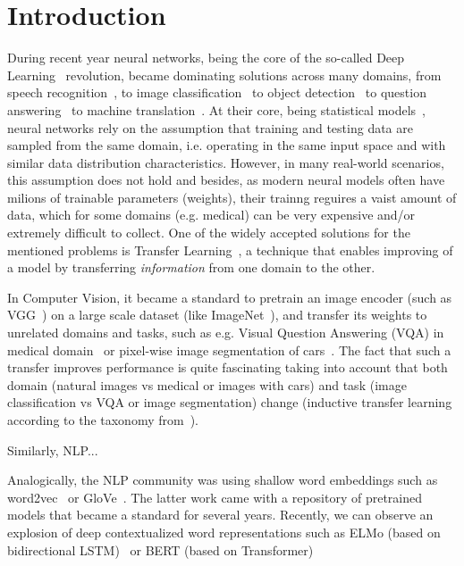 \section{Introduction}
During recent year neural networks, being the core of the so-called Deep Learning~\cite{lecun2015deep} revolution, became dominating solutions across many domains, from  speech recognition~\cite{graves2013speech}, to image classification~\cite{krizhevsky2012imagenet} to object detection~\cite{redmon2016you} to question answering~\cite{weston2014memory} to machine translation~\cite{bahdanau2014neural}.
At their core, being statistical models~\cite{ripley1993statistical,warner1996understanding}, neural networks rely on the assumption that training and testing data are sampled from the same domain, i.e. operating in the same input space and with similar data distribution characteristics.
However, in many real-world scenarios, this assumption does not hold and besides, as modern neural models often have  milions of trainable parameters (weights), their trainng reguires a vaist amount of data, which for some domains (e.g. medical) can be very expensive and/or extremely difficult to collect.
One of the widely accepted solutions for the mentioned problems is Transfer Learning~\cite{pan2009survey,weiss2016survey}, a technique that enables improving of a model by transferring \emph{information} from one domain to the other. 


In Computer Vision, it became a standard to pretrain an image encoder (such as VGG~\cite{simonyan2014very}) on a large scale dataset (like ImageNet~\cite{deng2009imagenet}), and transfer its weights to unrelated domains and tasks, such as e.g. Visual Question Answering (VQA) in medical domain~\cite{kornuta2019leveraging} or pixel-wise image segmentation of cars~\cite{iglovikov2018ternausnet}.
The fact that such a transfer improves performance is quite fascinating taking into account that both domain (natural images vs medical or images with cars) and task (image classification vs VQA or image segmentation) change (inductive transfer learning according to the taxonomy from~\cite{pan2009survey}).

Similarly, NLP...

Analogically, the NLP community was using shallow word embeddings such as word2vec~\cite{mikolov2013distributed} or GloVe~\cite{pennington2014glove}.
The latter work came with a repository of pretrained models that became a standard for several years.
Recently, we can observe an explosion of deep contextualized word representations such as ELMo (based on bidirectional LSTM)~\cite{peters2018deep} or BERT (based on Transformer)~\cite{devlin2018bert}

